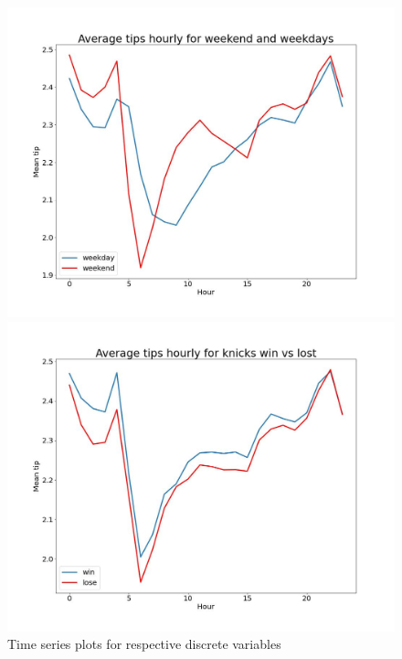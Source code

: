 \documentclass[11pt]{article}
\begin{document}
\begin{figure}[h]
    \centering
    \begin{minipage}[b]{0.45\textwidth}
        \centering
        \includegraphics[width=\textwidth]{plots/time_series_plot_weekday_weekend.jpeg}
    \end{minipage}
    \hfill
    \begin{minipage}[b]{0.45\textwidth}
        \centering
        \includegraphics[width=\textwidth]{plots/time_series_plot_win_lost.jpeg}
    \end{minipage}
    \hfill
    \caption{Time series plots for respective discrete variables}
\end{figure}
\end{document}
